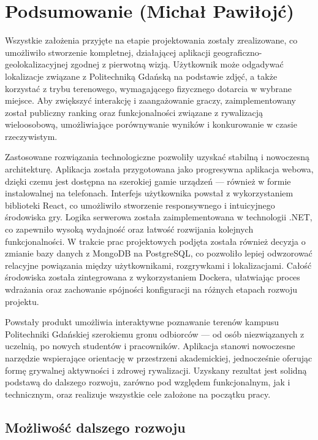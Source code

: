 \chapter{Podsumowanie (Michał Pawiłojć)}
\label{chap:summary}
Wszystkie założenia przyjęte na etapie projektowania zostały zrealizowane, co umożliwiło stworzenie kompletnej, działającej aplikacji geograficzno-geolokalizacyjnej zgodnej z pierwotną wizją. Użytkownik może odgadywać lokalizacje związane z Politechniką Gdańską na podstawie zdjęć, a także korzystać z trybu terenowego, wymagającego fizycznego dotarcia w wybrane miejsce. Aby zwiększyć interakcję i zaangażowanie graczy, zaimplementowany został publiczny ranking oraz funkcjonalności związane z rywalizacją wieloosobową, umożliwiające porównywanie wyników i konkurowanie w czasie rzeczywistym.

Zastosowane rozwiązania technologiczne pozwoliły uzyskać stabilną i nowoczesną architekturę. Aplikacja została przygotowana jako progresywna aplikacja webowa, dzięki czemu jest dostępna na szerokiej gamie urządzeń — również w formie instalowalnej na telefonach. Interfejs użytkownika powstał z wykorzystaniem biblioteki React, co umożliwiło stworzenie responsywnego i intuicyjnego środowiska gry. Logika serwerowa została zaimplementowana w technologii .NET, co zapewniło wysoką wydajność oraz łatwość rozwijania kolejnych funkcjonalności. W trakcie prac projektowych podjęta została również decyzja o zmianie bazy danych z MongoDB na PostgreSQL, co pozwoliło lepiej odwzorować relacyjne powiązania między użytkownikami, rozgrywkami i lokalizacjami. Całość środowiska została zintegrowana z wykorzystaniem Dockera, ułatwiając proces wdrażania oraz zachowanie spójności konfiguracji na różnych etapach rozwoju projektu.

Powstały produkt umożliwia interaktywne poznawanie terenów kampusu Politechniki Gdańskiej szerokiemu gronu odbiorców — od osób niezwiązanych z uczelnią, po nowych studentów i pracowników. Aplikacja stanowi nowoczesne narzędzie wspierające orientację w przestrzeni akademickiej, jednocześnie oferując formę grywalnej aktywności i zdrowej rywalizacji. Uzyskany rezultat jest solidną podstawą do dalszego rozwoju, zarówno pod względem funkcjonalnym, jak i technicznym, oraz realizuje wszystkie cele założone na początku pracy.

\section{Możliwość dalszego rozwoju}
\label{chap:enhancements}

